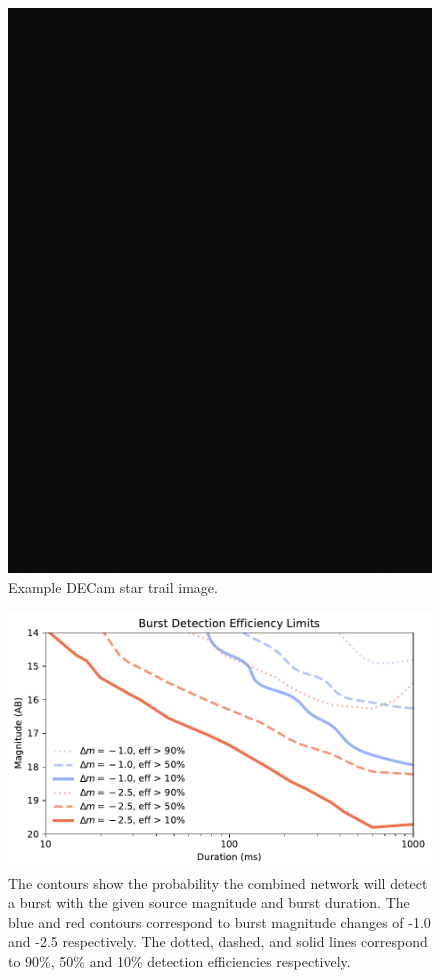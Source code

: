\documentclass[11pt]{article}
\begin{document}
\begin{figure}[htb]
\center
\includegraphics[scale=0.2]{blank.jpg}
\caption{Example DECam star trail image.}
\label{fig:2}
\end{figure}

\begin{figure}[htb]
\center
\includegraphics{f7.pdf}
\caption{The contours show the probability the combined network will detect a burst with the given source magnitude and burst duration. The blue and red contours correspond to burst magnitude changes of -1.0 and -2.5 respectively. The dotted, dashed, and solid lines correspond to 90\%, 50\% and 10\% detection efficiencies respectively.}
\label{fig:1}
\end{figure}
\end{document}
